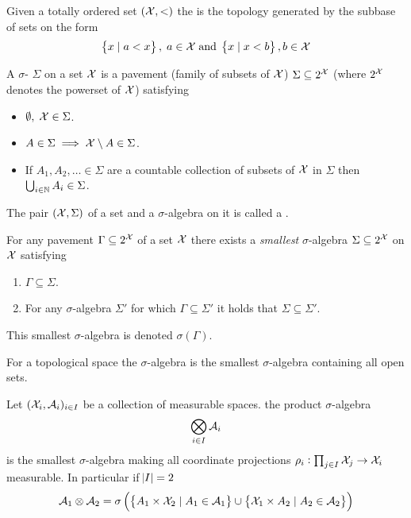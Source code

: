 
\begin{defn}
  Given a totally ordered set $(\mathcal{X}, <)$ the 
  is the topology generated by the subbase of sets on the form
  \[ \left\{ x \mid a < x \right\},\; a \in \mathcal{X}\; \mathrm{and} \;
  \left\{ x \mid x < b \right\}, b \in \mathcal{X} \]
  \label{defn:orderTop}
\end{defn}

\begin{defn}
  A $\sigma$- $\Sigma$ on a set $\mathcal{X}$ is a pavement (family of
  subsets of $\mathcal{X}$) $\Sigma \subseteq 2^\mathcal{X}$ (where $2^\mathcal{X}$ denotes the
  powerset of $\mathcal{X}$) satisfying
  \begin{itemize}
    \item $\emptyset,\; \mathcal{X} \in \Sigma$.
    \item $A \in \Sigma \implies \mathcal{X} \setminus A \in \Sigma$.
    \item If $A_1, A_2, \dots \in \Sigma$
      are a countable collection of subsets of $\mathcal{X}$
      in $\Sigma$ then $\bigcup_{i \in \mathbb{N}} A_i \in \Sigma$.
  \end{itemize}
  The pair $(\mathcal{X}, \Sigma)$ of a set and a $\sigma$-algebra on it is
  called a .
  \label{defn:sigmaAlg}
\end{defn}

\begin{thm}
  For any pavement $\Gamma \subseteq 2^\mathcal{X}$ of a set $\mathcal{X}$ there exists
  a \emph{smallest} $\sigma$-algebra $\Sigma \subseteq 2^\mathcal{X}$ on $\mathcal{X}$
  satisfying
  \begin{enumerate}
    \item $\Gamma \subseteq \Sigma$.
    \item For any $\sigma$-algebra $\Sigma'$ for which $\Gamma \subseteq \Sigma'$
      it holds that $\Sigma \subseteq \Sigma'$.
  \end{enumerate}
  This smallest $\sigma$-algebra is denoted $\sigma(\Gamma)$.
\end{thm}

\begin{defn}
  For a topological space the  $\sigma$-algebra is the smallest
  $\sigma$-algebra containing all open sets.
  \label{defn:BorelAlg}
\end{defn}

\begin{defn}
  Let $(\mathcal{X}_i, \mathcal{A}_i)_{i \in I}$ be a collection of measurable spaces.
  the product $\sigma$-algebra
  \[ \bigotimes_{i \in I} \mathcal{A}_i \]
  is the smallest $\sigma$-algebra making all coordinate projections
  $\rho_i : \prod_{j \in I} \mathcal{X}_j \to \mathcal{X}_i$
  measurable.
  In particular if $\abs{I} = 2$
  \[ \mathcal{A}_1 \otimes \mathcal{A}_2 = \sigma \left(
      \left\{ A_1 \times \mathcal{X}_2 \mid A_1 \in \mathcal{A}_1 \right\} \cup
  \left\{ \mathcal{X}_1 \times A_2 \mid A_2 \in \mathcal{A}_2 \right\} \right) \]
  \label{defn:prodSigmaAlg}
\end{defn}

